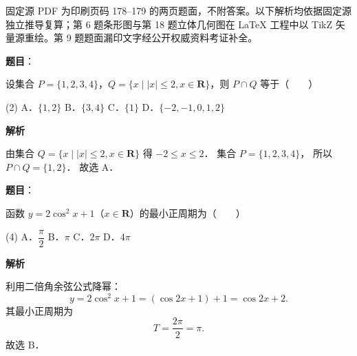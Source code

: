 

\begin{gktip}
固定源 PDF 为印刷页码 178–179 的两页题面，不附答案。以下解析均依据固定源独立推导复算；第 6 题条形图与第 18 题立体几何图在 LaTeX 工程中以 TikZ 矢量源重绘。第 9 题题面漏印文字经公开权威资料考证补全。
\end{gktip}

\begin{answer}

\textbf{题目}：

设集合 $P = \{1, 2, 3, 4\}$，$Q = \{x \mid |x| \leqslant 2, x \in \mathbf{R} \}$，则 $P \cap Q$ 等于\mbox{（　　）}

\begin{gkopts}(2)
\task A．$\{1, 2\}$
\task B．$\{3, 4\}$
\task C．$\{1\}$
\task D．$\{-2, -1, 0, 1, 2\}$
\end{gkopts}

\textbf{解析}

由集合 $Q = \{x \mid |x| \leqslant 2, x \in \mathbf{R} \}$ 得 $-2 \leqslant x \leqslant 2$．
集合 $P = \{1, 2, 3, 4\}$，
所以 $P \cap Q = \{1, 2\}$．
故选 A．


\end{answer}
\begin{answer}

\textbf{题目}：

函数 $y = 2\cos^2 x + 1$（$x \in \mathbf{R}$）的最小正周期为\mbox{（　　）}

\begin{gkopts}(4)
\task A．$\dfrac{\pi}{2}$
\task B．$\pi$
\task C．$2\pi$
\task D．$4\pi$
\end{gkopts}

\textbf{解析}

利用二倍角余弦公式降幂：
\nopagebreak[4]
\[
y = 2\cos^2 x + 1 = (\cos 2x + 1) + 1 = \cos 2x + 2.
\]
其最小正周期为
\nopagebreak[4]
\[
T = \frac{2\pi}{2} = \pi.
\]
故选 B．


\end{answer}
